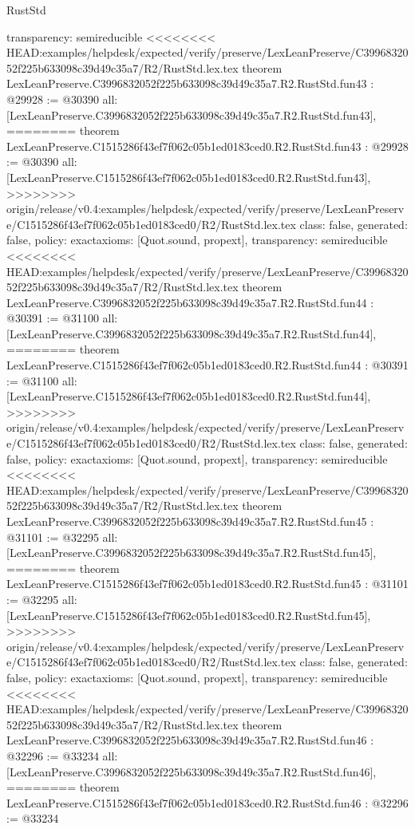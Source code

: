 \begin{lexlean}{RustStd}
\begin{coremodule}
{\begin{coremodule}
{{{{{{{{{{{{{{{{{{{{{{{{{{{{{{{{{{{{{{{{{{{{{{  transparency: semireducible
}
<<<<<<<< HEAD:examples/helpdesk/expected/verify/preserve/LexLeanPreserve/C3996832052f225b633098c39d49c35a7/R2/RustStd.lex.tex
theorem LexLeanPreserve.C3996832052f225b633098c39d49c35a7.R2.RustStd.fun43 : @29928 := @30390 {
  all: [LexLeanPreserve.C3996832052f225b633098c39d49c35a7.R2.RustStd.fun43],
========
theorem LexLeanPreserve.C1515286f43ef7f062c05b1ed0183ced0.R2.RustStd.fun43 : @29928 := @30390 {
  all: [LexLeanPreserve.C1515286f43ef7f062c05b1ed0183ced0.R2.RustStd.fun43],
>>>>>>>> origin/release/v0.4:examples/helpdesk/expected/verify/preserve/LexLeanPreserve/C1515286f43ef7f062c05b1ed0183ced0/R2/RustStd.lex.tex
  class: false,
  generated: false,
  policy: exact{axioms: [Quot.sound, propext]},
  transparency: semireducible
}
<<<<<<<< HEAD:examples/helpdesk/expected/verify/preserve/LexLeanPreserve/C3996832052f225b633098c39d49c35a7/R2/RustStd.lex.tex
theorem LexLeanPreserve.C3996832052f225b633098c39d49c35a7.R2.RustStd.fun44 : @30391 := @31100 {
  all: [LexLeanPreserve.C3996832052f225b633098c39d49c35a7.R2.RustStd.fun44],
========
theorem LexLeanPreserve.C1515286f43ef7f062c05b1ed0183ced0.R2.RustStd.fun44 : @30391 := @31100 {
  all: [LexLeanPreserve.C1515286f43ef7f062c05b1ed0183ced0.R2.RustStd.fun44],
>>>>>>>> origin/release/v0.4:examples/helpdesk/expected/verify/preserve/LexLeanPreserve/C1515286f43ef7f062c05b1ed0183ced0/R2/RustStd.lex.tex
  class: false,
  generated: false,
  policy: exact{axioms: [Quot.sound, propext]},
  transparency: semireducible
}
<<<<<<<< HEAD:examples/helpdesk/expected/verify/preserve/LexLeanPreserve/C3996832052f225b633098c39d49c35a7/R2/RustStd.lex.tex
theorem LexLeanPreserve.C3996832052f225b633098c39d49c35a7.R2.RustStd.fun45 : @31101 := @32295 {
  all: [LexLeanPreserve.C3996832052f225b633098c39d49c35a7.R2.RustStd.fun45],
========
theorem LexLeanPreserve.C1515286f43ef7f062c05b1ed0183ced0.R2.RustStd.fun45 : @31101 := @32295 {
  all: [LexLeanPreserve.C1515286f43ef7f062c05b1ed0183ced0.R2.RustStd.fun45],
>>>>>>>> origin/release/v0.4:examples/helpdesk/expected/verify/preserve/LexLeanPreserve/C1515286f43ef7f062c05b1ed0183ced0/R2/RustStd.lex.tex
  class: false,
  generated: false,
  policy: exact{axioms: [Quot.sound, propext]},
  transparency: semireducible
}
<<<<<<<< HEAD:examples/helpdesk/expected/verify/preserve/LexLeanPreserve/C3996832052f225b633098c39d49c35a7/R2/RustStd.lex.tex
theorem LexLeanPreserve.C3996832052f225b633098c39d49c35a7.R2.RustStd.fun46 : @32296 := @33234 {
  all: [LexLeanPreserve.C3996832052f225b633098c39d49c35a7.R2.RustStd.fun46],
========
theorem LexLeanPreserve.C1515286f43ef7f062c05b1ed0183ced0.R2.RustStd.fun46 : @32296 := @33234 {
}}}}}}}}}}}}}}}}}}}}}}}}}}}}}}}}}}}}}}}}}}}}}}}}}}
\end{coremodule}}
\end{coremodule}
\end{lexlean}
